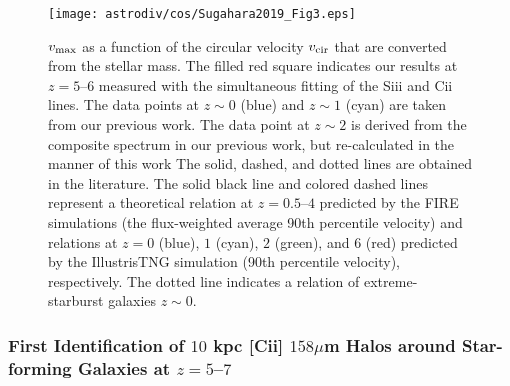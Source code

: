 \begin{figure}
\begin{center}
\texttt{[image: astrodiv/cos/Sugahara2019\_Fig3.eps]} 
\end{center}
\vspace{-5mm}
\caption{
$v_{\rm max}$ as a function of the circular velocity $v_{\rm cir}$ that are converted from the stellar mass. 
The filled red square indicates our results at $z=5$--$6$ 
measured with the simultaneous fitting of the Si{\sc ii} and {\sc Cii} lines. 
The data points at $z\sim0$ (blue) and $z\sim1$ (cyan) are 
taken from our previous work. 
The data point at $z\sim2$ is 
derived from the composite spectrum in our previous work, 
but re-calculated in the manner of this work
%
The solid, dashed, and dotted lines are obtained in the literature. 
The solid black line and colored dashed lines represent a theoretical relation at $z=0.5$--$4$ 
predicted by the FIRE simulations 
(the flux-weighted average 90th percentile velocity) 
and relations at $z=0$ (blue), $1$ (cyan), $2$ (green), and $6$ (red) 
predicted by the IllustrisTNG simulation 
(90th percentile velocity), 
respectively. 
The dotted line indicates a relation of extreme-starburst galaxies $z\sim0$. 
}
\label{cos:Sugahara2019_fig3}
\end{figure}










\subsubsection*{\bi
First Identification of $10$ kpc [{\sc Cii}] $158\mu$m Halos around Star-forming Galaxies at $z = 5$--$7$ 
{\rm \cite{fujimoto2019}}
}

